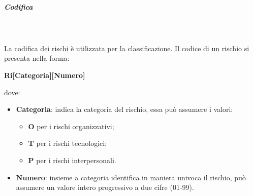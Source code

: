 \subparagraph{Codifica}\mbox{} \\ \mbox{} \\
La codifica dei rischi è utilizzata per la classificazione. Il codice di un rischio si presenta nella forma: \\
\centerline{\textbf{Ri[Categoria][Numero]}}
dove:
\begin{itemize}
	\item \textbf{Categoria}: indica la categoria del rischio, essa può assumere i valori:
	\begin{itemize}
		\item \textbf{O} per i rischi organizzativi;
		\item \textbf{T} per i rischi tecnologici;
		\item \textbf{P} per i rischi interpersonali.
	\end{itemize}
	\item \textbf{Numero}: insieme a categoria identifica in maniera univoca il rischio, può assumere un valore intero progressivo a due cifre (01-99).
\end{itemize}

